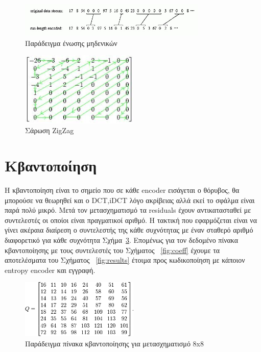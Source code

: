 \begin{figure}[h!]

  \centering
    \includegraphics[totalheight=0.2\textheight,width=0.8\textwidth]{chapter2/rle.jpg}
  \caption{Παράδειγμα ένωσης μηδενικών}
  \label{fig:rle}
\end{figure}

\begin{figure}[h!]

  \centering
  \includegraphics[width=0.5\textwidth]{chapter2/zigzag.jpg}
  \caption{Σάρωση ZigZag}
  \label{fig:zigzag}
\end{figure}

\newpage
\section{Κβαντοποίηση}
\label{section:sect25}

\indent Η κβαντοποίηση είναι το σημείο που σε κάθε encoder εισάγεται ο θόρυβος, θα μπορούσε να θεωρηθεί και ο DCT,iDCT λόγο ακρίβειας αλλά εκεί το σφάλμα είναι παρά πολύ μικρό. Μετά τον μετασχηματισμό τα residuals έχουν αντικατασταθεί με συντελεστές οι οποίοι είναι πραγματικοί αριθμό. Η τακτική που εφαρμόζεται είναι να γίνει ακέραια διαίρεση ο συντελεστής της κάθε συχνότητας με έναν σταθερό αριθμό διαφορετικό για κάθε συχνότητα Σχήμα~\ref{fig:quanttable}. Επομένως για τον δεδομένο πίνακα κβαντοποίησης με τους συντελεστές του Σχήματος ~\ref{fig:coeff} έχουμε τα αποτελέσματα του Σχήματος ~\ref{fig:results} έτοιμα προς κωδικοποίηση με κάποιον entropy encoder και εγγραφή.

\begin{figure}[h!]
\centering


    \includegraphics[width=0.5\textwidth]{chapter2/quanttable.png}
  \caption{Παράδειγμα πίνακα κβαντοποίησης για μετασχηματισμό 8x8}
  \label{fig:quanttable}
\end{figure}

